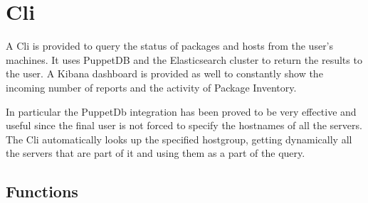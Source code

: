 \section{Cli}

A Cli is provided to query the status of packages and hosts from the
user's machines. It uses PuppetDB and the Elasticsearch cluster to return
the results to the user. A Kibana dashboard is provided as well to
constantly show the incoming number of reports and the activity of Package
Inventory.

In particular the PuppetDb integration has been proved to be very
effective and useful since the final user is not forced to specify the
hostnames of all the servers. The Cli automatically looks up the specified
hostgroup, getting dynamically all the servers that are part of it and
using them as a part of the query.

\subsection{Functions}

